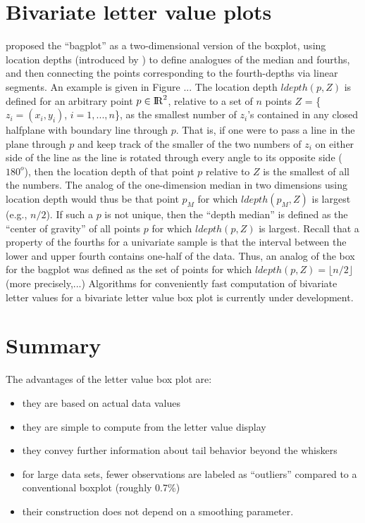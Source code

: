 \documentclass[oneside]{article}
\newcommand{\Reals}{{\rm I\kern-.1667em{}R}}
\begin{document}
\section{Bivariate letter value plots}

\citet{bagplots} proposed the ``bagplot''
as a two-dimensional version of the boxplot, using location 
depths (introduced by \citet{tukey75})
to define analogues of the median and fourths, and then
connecting the points corresponding to the fourth-depths 
via linear segments.  An example is given in Figure ...
The location depth $ldepth(p,Z)$ is defined for an arbitrary 
point $p \in \Reals^2$, relative to a set of $n$ points
$Z$ = \{$z_i = (x_i, y_i)$, $i = 1,...,n$\}, as 
the smallest number of $z_i$'s contained in
any closed halfplane with boundary line through $p$.
That is, if one were to pass a line in the plane through $p$
and keep track of the smaller of the two numbers of $z_i$ on 
either side of the line as the line is rotated through every
angle to its opposite side ($180^o$), then the location depth
of that point $p$ relative to $Z$ is the smallest of all the
numbers.  The analog of the one-dimension median in two
dimensions using location depth would thus be that point
$p_M$ for which $ldepth(p_M, Z)$ is largest (e.g., $n/2$).
If such a $p$ is not unique, then the ``depth median'' is
defined as the ``center of gravity'' of all points $p$ for
which $ldepth(p,Z)$ is largest.  Recall that a property
of the fourths for a univariate sample is that the 
interval between the lower and upper fourth contains
one-half of the data.  Thus, an analog of the box for
the bagplot was defined as the set of points for which
$ldepth(p,Z) = \lfloor n/2 \rfloor$ (more precisely,...)
Algorithms for conveniently fast computation of bivariate letter values 
for a bivariate letter value box plot 
is currently under development.
 



\section{Summary}

The advantages of the letter value box plot are:
\begin{itemize}
\item 
they are based on actual data values 
\item
they are simple to compute from the letter value display
\item 
they convey further information about tail behavior beyond the whiskers
\item
for large data sets, fewer observations are labeled as ``outliers''
compared to a conventional boxplot (roughly 0.7\%)
\item their construction does not depend on a smoothing parameter.
\end{itemize} 
\end{document}
